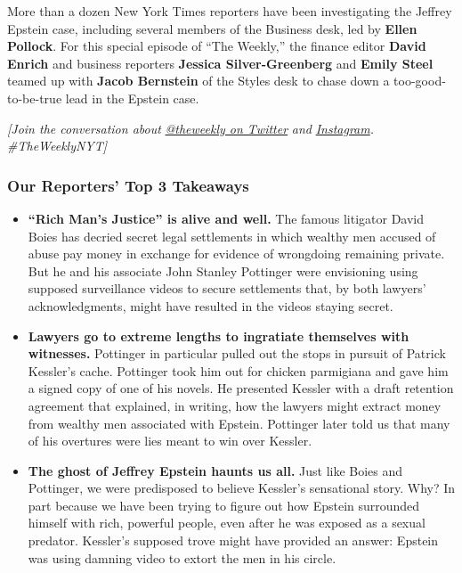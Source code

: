 More than a dozen New York Times reporters have been investigating the
Jeffrey Epstein case, including several members of the Business desk,
led by \textbf{Ellen Pollock}. For this special episode of ``The
Weekly,'' the finance editor \textbf{David Enrich} and business
reporters \textbf{Jessica Silver-Greenberg} and \textbf{Emily Steel}
teamed up with \textbf{Jacob Bernstein} of the Styles desk to chase down
a too-good-to-be-true lead in the Epstein case.

\emph{{[}Join the conversation about}
\href{https://twitter.com/TheWeekly}{\emph{@theweekly on Twitter}}
\emph{and}
\href{https://www.instagram.com/theweekly/}{\emph{Instagram}}\emph{.
\#TheWeeklyNYT{]}}

\hypertarget{our-reporters-top-3-takeaways}{%
\subsubsection{Our Reporters' Top 3
Takeaways}\label{our-reporters-top-3-takeaways}}

\begin{itemize}
\item
  \textbf{``Rich Man's Justice'' is alive and well.} The famous
  litigator David Boies has decried secret legal settlements in which
  wealthy men accused of abuse pay money in exchange for evidence of
  wrongdoing remaining private. But he and his associate John Stanley
  Pottinger were envisioning using supposed surveillance videos to
  secure settlements that, by both lawyers' acknowledgments, might have
  resulted in the videos staying secret.
\item
  \textbf{Lawyers go to extreme lengths to ingratiate themselves with
  witnesses.} Pottinger in particular pulled out the stops in pursuit of
  Patrick Kessler's cache. Pottinger took him out for chicken parmigiana
  and gave him a signed copy of one of his novels. He presented Kessler
  with a draft retention agreement that explained, in writing, how the
  lawyers might extract money from wealthy men associated with Epstein.
  Pottinger later told us that many of his overtures were lies meant to
  win over Kessler.
\item
  \textbf{The ghost of Jeffrey Epstein haunts us all.} Just like Boies
  and Pottinger, we were predisposed to believe Kessler's sensational
  story. Why? In part because we have been trying to figure out how
  Epstein surrounded himself with rich, powerful people, even after he
  was exposed as a sexual predator. Kessler's supposed trove might have
  provided an answer: Epstein was using damning video to extort the men
  in his circle.
\end{itemize}

